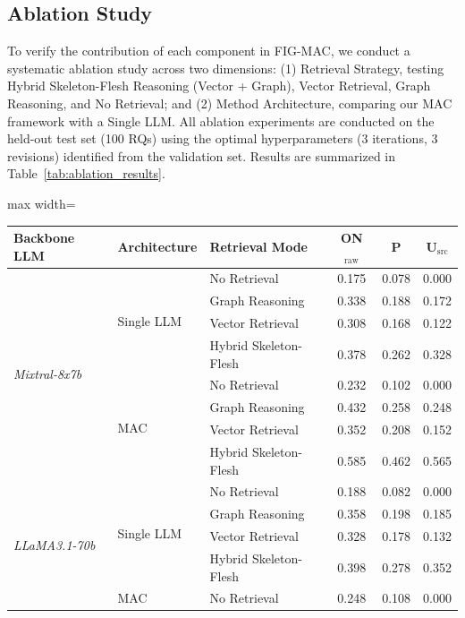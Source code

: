 \documentclass[runningheads]{llncs}
\begin{document}
\subsection{Ablation Study}
\label{sec:ablation}

To verify the contribution of each component in FIG-MAC, we conduct a systematic ablation study across two dimensions: (1) Retrieval Strategy, testing Hybrid Skeleton-Flesh Reasoning (Vector + Graph), Vector Retrieval, Graph Reasoning, and No Retrieval; and (2) Method Architecture, comparing our MAC framework with a Single LLM. All ablation experiments are conducted on the held-out test set (100 RQs) using the optimal hyperparameters (3 iterations, 3 revisions) identified from the validation set. Results are summarized in Table~\ref{tab:ablation_results}.

\begin{table}[t]
\centering
\small
\begin{adjustbox}{max width=\textwidth}
\begin{tabular}{lllccc}
\toprule
\textbf{Backbone LLM} & \textbf{Architecture} & \textbf{Retrieval Mode} & \textbf{ON$_{\text{raw}}$} & \textbf{P} & \textbf{U$_{\text{src}}$} \\
\midrule
\multirow{8}{*}{\textit{Mixtral-8x7b}} 
 & \multirow{4}{*}{Single LLM} & No Retrieval & 0.175 & 0.078 & 0.000 \\
 &  & Graph Reasoning & 0.338 & 0.188 & 0.172 \\
 &  & Vector Retrieval & 0.308 & 0.168 & 0.122 \\
 &  & Hybrid Skeleton-Flesh & 0.378 & 0.262 & 0.328 \\
\cmidrule{2-6}
 & \multirow{4}{*}{MAC} & No Retrieval & 0.232 & 0.102 & 0.000 \\
 &  & Graph Reasoning & 0.432 & 0.258 & 0.248 \\
 &  & Vector Retrieval & 0.352 & 0.208 & 0.152 \\
 &  & Hybrid Skeleton-Flesh & 0.585 & 0.462 & 0.565 \\
\midrule
\multirow{8}{*}{\textit{LLaMA3.1-70b}} 
 & \multirow{4}{*}{Single LLM} & No Retrieval & 0.188 & 0.082 & 0.000 \\
 &  & Graph Reasoning & 0.358 & 0.198 & 0.185 \\
 &  & Vector Retrieval & 0.328 & 0.178 & 0.132 \\
 &  & Hybrid Skeleton-Flesh & 0.398 & 0.278 & 0.352 \\
\cmidrule{2-6}
 & \multirow{4}{*}{MAC} & No Retrieval & 0.248 & 0.108 & 0.000 \\

\end{tabular}
\end{adjustbox}
\end{table}
\end{document}
